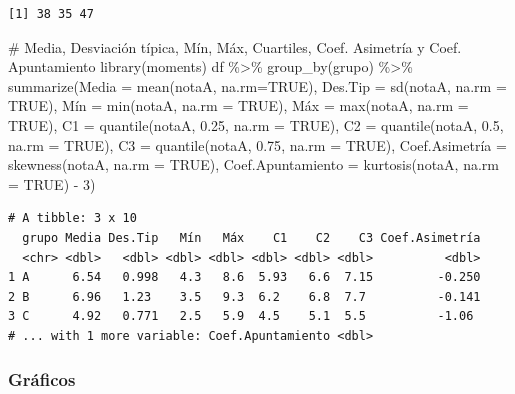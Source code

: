 \documentclass[
  a4paper,
]{scrreport}
\newenvironment{Shaded}{\begin{snugshade}}{\end{snugshade}}
\newcommand{\AttributeTok}[1]{\textcolor[rgb]{0.40,0.45,0.13}{#1}}
\newcommand{\CommentTok}[1]{\textcolor[rgb]{0.37,0.37,0.37}{#1}}
\newcommand{\ConstantTok}[1]{\textcolor[rgb]{0.56,0.35,0.01}{#1}}
\newcommand{\DecValTok}[1]{\textcolor[rgb]{0.68,0.00,0.00}{#1}}
\newcommand{\FloatTok}[1]{\textcolor[rgb]{0.68,0.00,0.00}{#1}}
\newcommand{\FunctionTok}[1]{\textcolor[rgb]{0.28,0.35,0.67}{#1}}
\newcommand{\NormalTok}[1]{\textcolor[rgb]{0.00,0.23,0.31}{#1}}
\newcommand{\OtherTok}[1]{\textcolor[rgb]{0.00,0.23,0.31}{#1}}
\newcommand{\SpecialCharTok}[1]{\textcolor[rgb]{0.37,0.37,0.37}{#1}}
\theoremstyle{definition}
\theoremstyle{definition}
\theoremstyle{remark}
\begin{document}
\begin{verbatim}
[1] 38 35 47
\end{verbatim}

\begin{Shaded}
\begin{Highlighting}[]
\CommentTok{\# Media, Desviación típica, Mín, Máx, Cuartiles, Coef. Asimetría y Coef. Apuntamiento}
\FunctionTok{library}\NormalTok{(moments)}
\NormalTok{df }\SpecialCharTok{\%\textgreater{}\%} \FunctionTok{group\_by}\NormalTok{(grupo) }\SpecialCharTok{\%\textgreater{}\%} \FunctionTok{summarize}\NormalTok{(}\AttributeTok{Media =} \FunctionTok{mean}\NormalTok{(notaA, }\AttributeTok{na.rm=}\ConstantTok{TRUE}\NormalTok{), }\AttributeTok{Des.Tip =} \FunctionTok{sd}\NormalTok{(notaA, }\AttributeTok{na.rm =} \ConstantTok{TRUE}\NormalTok{), Mín }\OtherTok{=} \FunctionTok{min}\NormalTok{(notaA, }\AttributeTok{na.rm =} \ConstantTok{TRUE}\NormalTok{), Máx }\OtherTok{=} \FunctionTok{max}\NormalTok{(notaA, }\AttributeTok{na.rm =} \ConstantTok{TRUE}\NormalTok{), }\AttributeTok{C1 =} \FunctionTok{quantile}\NormalTok{(notaA, }\FloatTok{0.25}\NormalTok{, }\AttributeTok{na.rm =} \ConstantTok{TRUE}\NormalTok{), }\AttributeTok{C2 =} \FunctionTok{quantile}\NormalTok{(notaA, }\FloatTok{0.5}\NormalTok{, }\AttributeTok{na.rm =} \ConstantTok{TRUE}\NormalTok{), }\AttributeTok{C3 =} \FunctionTok{quantile}\NormalTok{(notaA, }\FloatTok{0.75}\NormalTok{, }\AttributeTok{na.rm =} \ConstantTok{TRUE}\NormalTok{), Coef.Asimetría }\OtherTok{=} \FunctionTok{skewness}\NormalTok{(notaA, }\AttributeTok{na.rm =} \ConstantTok{TRUE}\NormalTok{), }\AttributeTok{Coef.Apuntamiento =} \FunctionTok{kurtosis}\NormalTok{(notaA, }\AttributeTok{na.rm =} \ConstantTok{TRUE}\NormalTok{) }\SpecialCharTok{{-}} \DecValTok{3}\NormalTok{)}
\end{Highlighting}
\end{Shaded}

\begin{verbatim}
# A tibble: 3 x 10
  grupo Media Des.Tip   Mín   Máx    C1    C2    C3 Coef.Asimetría
  <chr> <dbl>   <dbl> <dbl> <dbl> <dbl> <dbl> <dbl>          <dbl>
1 A      6.54   0.998   4.3   8.6  5.93   6.6  7.15         -0.250
2 B      6.96   1.23    3.5   9.3  6.2    6.8  7.7          -0.141
3 C      4.92   0.771   2.5   5.9  4.5    5.1  5.5          -1.06 
# ... with 1 more variable: Coef.Apuntamiento <dbl>
\end{verbatim}

\hypertarget{gruxe1ficos-4}{%
\subsubsection{Gráficos}\label{gruxe1ficos-4}}
\end{document}
